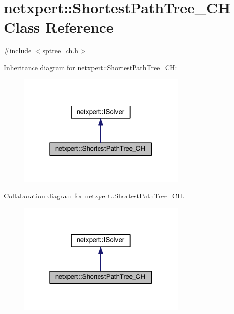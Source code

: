 \hypertarget{classnetxpert_1_1ShortestPathTree__CH}{}\section{netxpert\+:\+:Shortest\+Path\+Tree\+\_\+\+CH Class Reference}
\label{classnetxpert_1_1ShortestPathTree__CH}


{\ttfamily \#include $<$sptree\+\_\+ch.\+h$>$}



Inheritance diagram for netxpert\+:\+:Shortest\+Path\+Tree\+\_\+\+CH\+:\nopagebreak
\begin{figure}[H]
\begin{center}
\leavevmode
\includegraphics[width=235pt]{classnetxpert_1_1ShortestPathTree__CH__inherit__graph}
\end{center}
\end{figure}


Collaboration diagram for netxpert\+:\+:Shortest\+Path\+Tree\+\_\+\+CH\+:\nopagebreak
\begin{figure}[H]
\begin{center}
\leavevmode
\includegraphics[width=235pt]{classnetxpert_1_1ShortestPathTree__CH__coll__graph}
\end{center}
\end{figure}
